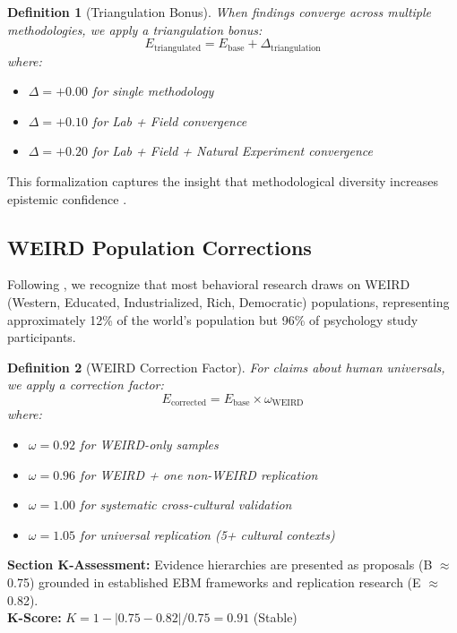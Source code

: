 \documentclass[11pt,a4paper]{article}
\newtheorem{definition}{Definition}
\begin{document}
\begin{definition}[Triangulation Bonus]
When findings converge across multiple methodologies, we apply a
triangulation bonus:
\begin{equation}
E_{\text{triangulated}} = E_{\text{base}} + \Delta_{\text{triangulation}}
\end{equation}
where:
\begin{itemize}
    \item $\Delta = +0.00$ for single methodology
    \item $\Delta = +0.10$ for Lab + Field convergence
    \item $\Delta = +0.20$ for Lab + Field + Natural Experiment convergence
\end{itemize}
\end{definition}

This formalization captures the insight that methodological diversity
increases epistemic confidence \citep{Munafò2017}.

\subsection{WEIRD Population Corrections}

Following \citet{Henrich2010}, we recognize that most behavioral research
draws on WEIRD (Western, Educated, Industrialized, Rich, Democratic)
populations, representing approximately 12\% of the world's population
but 96\% of psychology study participants.

\begin{definition}[WEIRD Correction Factor]
For claims about human universals, we apply a correction factor:
\begin{equation}
E_{\text{corrected}} = E_{\text{base}} \times \omega_{\text{WEIRD}}
\end{equation}
where:
\begin{itemize}
    \item $\omega = 0.92$ for WEIRD-only samples
    \item $\omega = 0.96$ for WEIRD + one non-WEIRD replication
    \item $\omega = 1.00$ for systematic cross-cultural validation
    \item $\omega = 1.05$ for universal replication (5+ cultural contexts)
\end{itemize}
\end{definition}

\begin{eslbox}
\textbf{Section K-Assessment:} Evidence hierarchies are presented as
proposals (B $\approx$ 0.75) grounded in established EBM frameworks and
replication research (E $\approx$ 0.82). \\
\textbf{K-Score:} $K = 1 - |0.75 - 0.82| / 0.75 = 0.91$ (Stable)
\end{eslbox}
\end{document}
